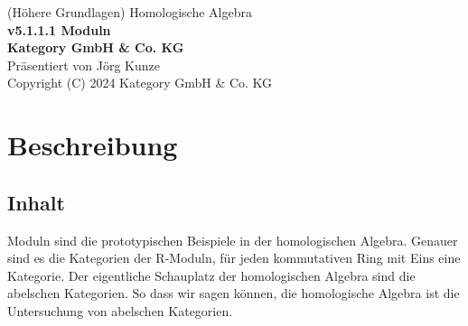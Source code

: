 \documentclass[a4paper]{amsart}
\theoremstyle{definition}
\begin{document}
\begin{titlepage}
\centering
{\huge
(Höhere Grundlagen) Homologische Algebra\\[1cm]
\textbf{v5.1.1.1 Moduln}
}\\[1cm]

\textbf{Kategory GmbH \& Co. KG}\\
Präsentiert von Jörg Kunze\\
Copyright (C) 2024 Kategory GmbH \& Co. KG

\end{titlepage}

%

\newpage

\section*{Beschreibung}

\subsection*{Inhalt}
Moduln sind die prototypischen Beispiele in der homologischen Algebra. Genauer sind es die Kategorien der R-Moduln, für jeden kommutativen Ring mit Eins eine Kategorie. Der eigentliche Schauplatz der homologischen Algebra sind die abelschen Kategorien. So dass wir sagen können, die homologische Algebra ist die Untersuchung von abelschen Kategorien.
\end{document}

